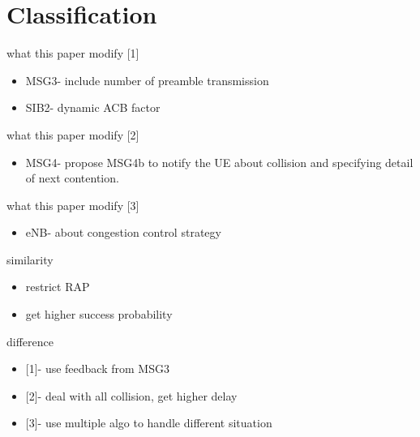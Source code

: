 \documentclass{beamer}
\begin{document}
\section{Classification}
\begin{frame}{{what this paper modify [1]}}
    \begin{itemize}
    \item {MSG3- include number of preamble transmission}
    \item {SIB2- dynamic ACB factor}
    \end{itemize}
\end{frame}
\begin{frame}{{what this paper modify [2]}}
    \begin{itemize}
    \item {MSG4- propose MSG4b to notify the UE about collision and specifying detail of next contention.}
    \end{itemize}
\end{frame}
\begin{frame}{{what this paper modify [3]}}
    \begin{itemize}
    \item {eNB- about congestion control strategy}
    \end{itemize}    
\end{frame}
\begin{frame}{{similarity}}
    \begin{itemize}
    \item {restrict RAP}
    \item {get higher success probability}
    \end{itemize}    
\end{frame}
\begin{frame}{{difference}}
    \begin{itemize}
    \item {[1]- use feedback from MSG3}
    \item {[2]- deal with all collision, get higher delay}
    \item {[3]- use multiple algo to handle different situation}
    \end{itemize}    
\end{frame}
\end{document}
